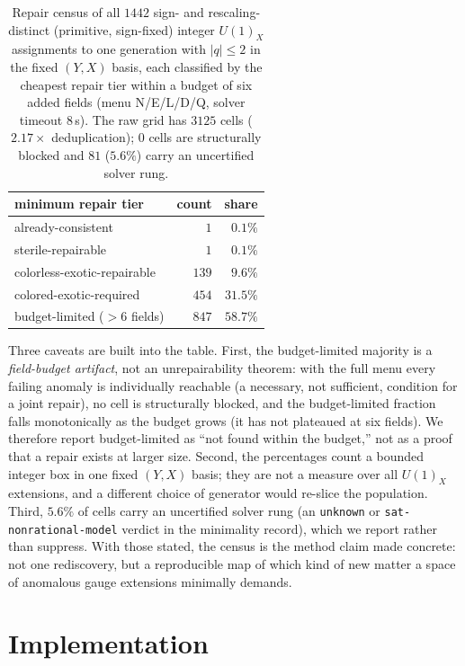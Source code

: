 \documentclass[11pt]{article}
\newcommand{\UX}{U(1)_X}
\begin{document}
\begin{table}[t]
\centering
\small
\begin{tabular}{@{}lrr@{}}
\toprule
minimum repair tier & count & share\\
\midrule
already-consistent & $1$ & $0.1\%$\\
sterile-repairable & $1$ & $0.1\%$\\
colorless-exotic-repairable & $139$ & $9.6\%$\\
colored-exotic-required & $454$ & $31.5\%$\\
budget-limited ($>6$ fields) & $847$ & $58.7\%$\\
\bottomrule
\end{tabular}
\caption{Repair census of all $1442$ sign- and rescaling-distinct
(primitive, sign-fixed) integer $\UX$ assignments to one generation with $|q|\le2$ in the
fixed $(Y,X)$ basis, each classified by the cheapest repair tier within a budget
of six added fields (menu N/E/L/D/Q, solver timeout $8\,$s). The raw grid has
$3125$ cells ($2.17\times$ deduplication); $0$ cells are structurally blocked and
$81$ ($5.6\%$) carry an uncertified solver rung.}
\label{tab:census}
\end{table}

Three caveats are built into the table. First, the budget-limited majority is a
\emph{field-budget artifact}, not an unrepairability theorem: with the full menu
every failing anomaly is individually reachable (a necessary, not sufficient,
condition for a joint repair), no cell is structurally blocked, and the
budget-limited fraction falls monotonically as the budget grows (it has not
plateaued at six fields). We therefore report budget-limited as ``not found
within the budget,'' not as a proof that a repair exists at larger size. Second, the percentages count a bounded integer box
in one fixed $(Y,X)$ basis; they are not a measure over all $\UX$ extensions, and
a different choice of generator would re-slice the population. Third, $5.6\%$ of
cells carry an uncertified solver rung (an \texttt{unknown} or
\texttt{sat-nonrational-model} verdict in the minimality record), which we report rather
than suppress. With those stated, the census is the method claim made concrete:
not one rediscovery, but a reproducible map of which kind of new matter a space
of anomalous gauge extensions minimally demands.

\section{Implementation}
\label{sec:impl}
\end{document}
